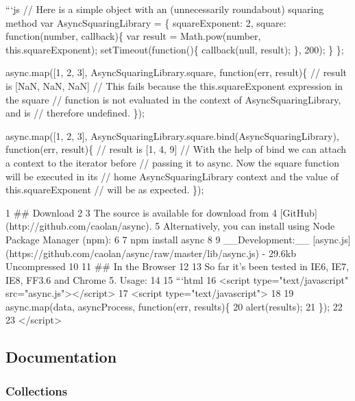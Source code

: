 ```js // Here is a simple object with an (unnecessarily roundabout) squaring method var Async\+Squaring\+Library = \{ square\+Exponent\+: 2, square\+: function(number, callback)\{ var result = Math.\+pow(number, this.\+square\+Exponent); set\+Timeout(function()\{ callback(null, result); \}, 200); \} \};

async.\+map(\mbox{[}1, 2, 3\mbox{]}, Async\+Squaring\+Library.\+square, function(err, result)\{ // result is \mbox{[}Na\+N, Na\+N, Na\+N\mbox{]} // This fails because the {\ttfamily this.\+square\+Exponent} expression in the square // function is not evaluated in the context of Async\+Squaring\+Library, and is // therefore undefined. \});

async.\+map(\mbox{[}1, 2, 3\mbox{]}, Async\+Squaring\+Library.\+square.\+bind(\+Async\+Squaring\+Library), function(err, result)\{ // result is \mbox{[}1, 4, 9\mbox{]} // With the help of bind we can attach a context to the iterator before // passing it to async. Now the square function will be executed in its // \textquotesingle{}home\textquotesingle{} Async\+Squaring\+Library context and the value of {\ttfamily this.\+square\+Exponent} // will be as expected. \}); 
\begin{DoxyCode}
1 ## Download
2 
3 The source is available for download from
4 [GitHub](http://github.com/caolan/async).
5 Alternatively, you can install using Node Package Manager (npm):
6 
7     npm install async
8 
9 \_\_Development:\_\_ [async.js](https://github.com/caolan/async/raw/master/lib/async.js) - 29.6kb Uncompressed
10 
11 ## In the Browser
12 
13 So far it's been tested in IE6, IE7, IE8, FF3.6 and Chrome 5. Usage:
14 
15 ```html
16 <script type="text/javascript" src="async.js"></script>
17 <script type="text/javascript">
18 
19     async.map(data, asyncProcess, function(err, results)\{
20         alert(results);
21     \});
22 
23 </script>
\end{DoxyCode}


\subsection*{Documentation}

\subsubsection*{Collections}


